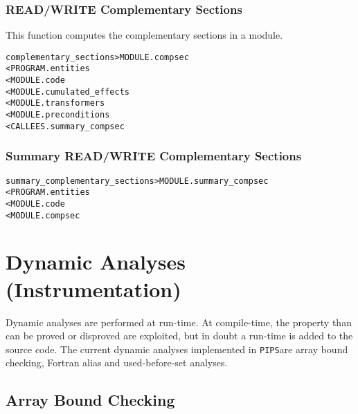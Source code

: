 \documentclass[a4paper]{report}
\newenvironment{PipsMake}{\begin{alltt}}{\end{alltt}}
\newenvironment{PipsPass}[1]{\label{pass:#1}}{}
\newcommand{\Pips}{\texttt{PIPS}}
\begin{document}
\subsection{READ/WRITE Complementary Sections}
\label{subsubsection-complementary-sections}

\begin{PipsPass}{complementary_sections}
This function computes the complementary sections in a module.
\end{PipsPass}
\begin{PipsMake}
complementary_sections > MODULE.compsec
        < PROGRAM.entities
        < MODULE.code
        < MODULE.cumulated_effects
        < MODULE.transformers
        < MODULE.preconditions
        < CALLEES.summary_compsec
\end{PipsMake}

\subsection{Summary READ/WRITE Complementary Sections}
\label{subsubsection-summary-complementary-sections}


\begin{PipsMake}
summary_complementary_sections > MODULE.summary_compsec
        < PROGRAM.entities
        < MODULE.code
        < MODULE.compsec
\end{PipsMake}


\chapter{Dynamic Analyses (Instrumentation)}

Dynamic analyses are performed at run-time. At compile-time, the
property than can be proved or disproved are exploited, but in doubt a
run-time is added to the source code. The current dynamic analyses
implemented in \Pips are array bound checking, Fortran alias and
used-before-set analyses.


\section{Array Bound Checking}
\label{subsection-array-bound-checking}
\end{document}
